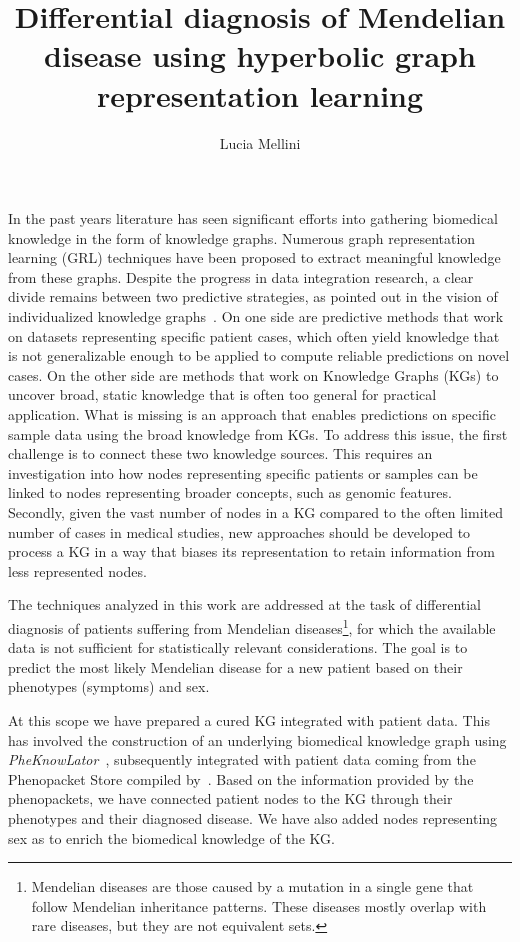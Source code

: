\documentclass[11pt]{article}
\title{Differential diagnosis of Mendelian disease using hyperbolic graph representation learning}
\author{Lucia Mellini}
\date{}
\begin{document}
\maketitle

In the past years literature has seen significant efforts into gathering biomedical knowledge in the form of knowledge graphs. Numerous graph representation learning (GRL) techniques have been proposed to extract meaningful knowledge from these graphs. Despite the progress in data integration research, a clear divide remains between two predictive strategies, as pointed out in the vision of individualized knowledge graphs~\cite{PingPeipei2017IKGA}. On one side are predictive methods that work on datasets representing specific patient cases, which often yield knowledge that is not generalizable enough to be applied to compute reliable predictions on novel cases. On the other side are methods that work on Knowledge Graphs (KGs) to uncover broad, static knowledge that is often too general for practical application. What is missing is an approach that enables predictions on specific sample data using the broad knowledge from KGs. To address this issue, the first challenge is to connect these two knowledge sources. This requires an investigation into how nodes representing specific patients or samples can be linked to nodes representing broader concepts, such as genomic features. Secondly, given the vast number of nodes in a KG compared to the often limited number of cases in medical studies, new approaches should be developed to process a KG in a way that biases its representation to retain information from less represented nodes.

The techniques analyzed in this work are addressed at the task of differential diagnosis of patients suffering from Mendelian diseases\footnote{Mendelian diseases are those caused by a mutation in a single gene that follow Mendelian inheritance patterns. These diseases mostly overlap with rare diseases, but they are not equivalent sets.}, for which the available data is not sufficient for statistically relevant considerations. The goal is to predict the most likely Mendelian disease for a new patient based on their phenotypes (symptoms) and sex. 

At this scope we have prepared a cured KG integrated with patient data. This has involved the construction of an underlying biomedical knowledge graph using \emph{PheKnowLator}~\cite{callahan2020PheKnowlator}, subsequently integrated with patient data coming from the Phenopacket Store compiled by~\cite{Danis2025Phenopackets}. Based on the information provided by the phenopackets, we have connected patient nodes to the KG through their phenotypes and their diagnosed disease. We have also added nodes representing sex as to enrich the biomedical knowledge of the KG.
\end{document}
